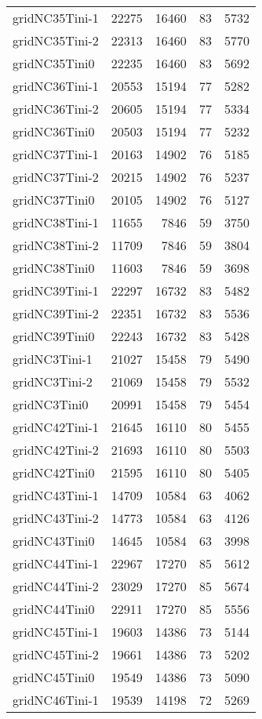 \begin{longtable}{lrrrr}
gridNC35Tini-1 & 22275 & 16460 & 83 & 5732 \\
gridNC35Tini-2 & 22313 & 16460 & 83 & 5770 \\
gridNC35Tini0 & 22235 & 16460 & 83 & 5692 \\
gridNC36Tini-1 & 20553 & 15194 & 77 & 5282 \\
gridNC36Tini-2 & 20605 & 15194 & 77 & 5334 \\
gridNC36Tini0 & 20503 & 15194 & 77 & 5232 \\
gridNC37Tini-1 & 20163 & 14902 & 76 & 5185 \\
gridNC37Tini-2 & 20215 & 14902 & 76 & 5237 \\
gridNC37Tini0 & 20105 & 14902 & 76 & 5127 \\
gridNC38Tini-1 & 11655 & 7846 & 59 & 3750 \\
gridNC38Tini-2 & 11709 & 7846 & 59 & 3804 \\
gridNC38Tini0 & 11603 & 7846 & 59 & 3698 \\
gridNC39Tini-1 & 22297 & 16732 & 83 & 5482 \\
gridNC39Tini-2 & 22351 & 16732 & 83 & 5536 \\
gridNC39Tini0 & 22243 & 16732 & 83 & 5428 \\
gridNC3Tini-1 & 21027 & 15458 & 79 & 5490 \\
gridNC3Tini-2 & 21069 & 15458 & 79 & 5532 \\
gridNC3Tini0 & 20991 & 15458 & 79 & 5454 \\
gridNC42Tini-1 & 21645 & 16110 & 80 & 5455 \\
gridNC42Tini-2 & 21693 & 16110 & 80 & 5503 \\
gridNC42Tini0 & 21595 & 16110 & 80 & 5405 \\
gridNC43Tini-1 & 14709 & 10584 & 63 & 4062 \\
gridNC43Tini-2 & 14773 & 10584 & 63 & 4126 \\
gridNC43Tini0 & 14645 & 10584 & 63 & 3998 \\
gridNC44Tini-1 & 22967 & 17270 & 85 & 5612 \\
gridNC44Tini-2 & 23029 & 17270 & 85 & 5674 \\
gridNC44Tini0 & 22911 & 17270 & 85 & 5556 \\
gridNC45Tini-1 & 19603 & 14386 & 73 & 5144 \\
gridNC45Tini-2 & 19661 & 14386 & 73 & 5202 \\
gridNC45Tini0 & 19549 & 14386 & 73 & 5090 \\
gridNC46Tini-1 & 19539 & 14198 & 72 & 5269 \\

\end{longtable}
